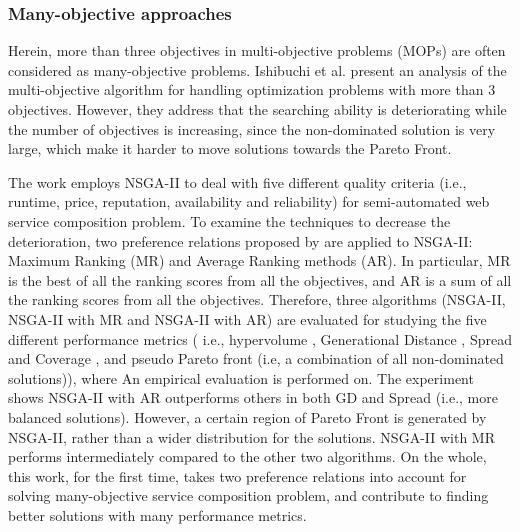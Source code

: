 \subsubsection{Many-objective approaches}\label{ManyObjective}

Herein, more than three objectives in multi-objective problems (MOPs) are often considered as many-objective problems. Ishibuchi et al. \cite{ishibuchi2008evolutionary} present an analysis of the multi-objective algorithm for handling optimization problems with more than 3 objectives. However, they address that the searching ability is deteriorating while the number of objectives is increasing, since the non-dominated solution is very large, which make it harder to move solutions towards the Pareto Front.

The work \cite{de2010many} employs NSGA-II to deal with five different quality criteria (i.e., runtime, price, reputation, availability and reliability) for semi-automated web service composition problem.  To examine the techniques to decrease the deterioration, two preference relations proposed by \cite{bentley1997finding} are applied to NSGA-II: Maximum Ranking (MR) and Average Ranking methods (AR). In particular, MR is the best of all the ranking scores from all the objectives, and AR is a sum of all the ranking scores from all the objectives. Therefore, three algorithms (NSGA-II, NSGA-II with MR and NSGA-II with AR) are evaluated for studying the five different performance metrics ( i.e., hypervolume \cite{zitzler1999evolutionary}, Generational Distance \cite{van2000measuring}, Spread and Coverage \cite{zitzler2000comparison}, and pseudo Pareto front (i.e, a combination of all non-dominated solutions)),  where An empirical evaluation is performed on. The experiment shows NSGA-II with AR outperforms others in both GD and Spread (i.e., more balanced solutions). However,  a certain region of  Pareto Front is generated by NSGA-II,  rather than a wider distribution for the solutions. NSGA-II with MR performs intermediately compared to the other two algorithms. On the whole,  this work, for the first time, takes two preference relations into account for solving many-objective service composition problem, and contribute to finding better solutions with many performance metrics.



